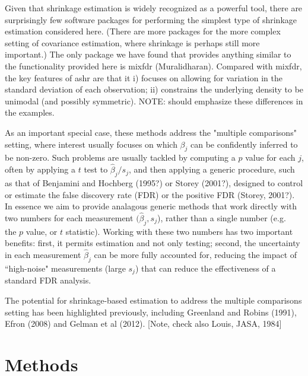 \documentclass[11pt]{article}
\begin{document}
Given that shrinkage estimation is widely recognized as a powerful tool, there are surprisingly few software packages for performing the simplest type of shrinkage estimation considered here. (There are more packages for the more complex setting of covariance estimation, where shrinkage is perhaps still more important.)
The only package we have found that provides anything similar
to the functionality provided here is mixfdr (Muralidharan). Compared with mixfdr, the key features of ashr are that it
i) focuses on allowing for variation in the standard deviation of each observation; ii) constrains the underlying density to be unimodal (and possibly symmetric).
NOTE: should emphasize these differences in the examples.

As an important special case, these methods address the "multiple comparisons" setting, where interest usually focuses on which $\beta_j$ can be confidently inferred to be non-zero. Such problems are usually tackled by computing a $p$ value for each $j$, often by applying a $t$ test to $\hat\beta_j/s_j$,
and then applying a generic procedure, such as that of Benjamini 
and Hochberg (1995?) or Storey (2001?), designed to control or
estimate the false discovery rate (FDR) or the positive FDR (Storey, 2001?). In essence we aim to provide analagous
generic methods that work directly with two numbers for each 
measurement $(\hat\beta_j,s_j$), rather than a single number (e.g.~ the $p$ value, or $t$ statistic). Working with these two numbers has two important benefits: first, it permits estimation and not only testing; second, the 
uncertainty in each measurement $\hat\beta_j$ can be more fully accounted for, reducing the impact of ``high-noise" measurements (large $s_j$) that can reduce the effectiveness of a standard FDR analysis. 

The potential for shrinkage-based estimation to
address the multiple comparisons setting 
has been highlighted
previously, including Greenland and Robins (1991),
Efron (2008) and Gelman et al (2012). [Note, check also Louis, JASA, 1984] 


 \section*{Methods}
 
\end{document}
